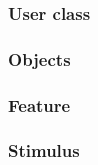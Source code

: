 \subsubsection{User class}


\subsubsection{Objects}


\subsubsection{Feature}


\subsubsection{Stimulus}

